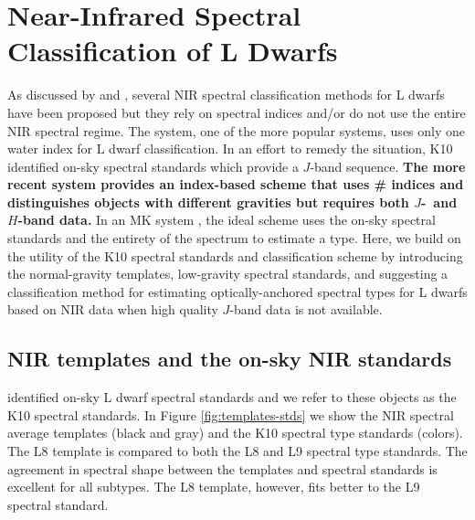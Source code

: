 \documentclass[12pt,preprint]{aastex}
\begin{document}



\section{Near-Infrared Spectral Classification of L Dwarfs}
\label{sec:classification}

As discussed by \citet[\S~3.2]{Kirkpatrick05} and \citet[abbreviated as K10]{Kirkpatrick10}, several NIR spectral classification methods for L dwarfs have been proposed but they rely on spectral indices and/or do not use the entire NIR spectral regime. The \citet{Geballe02} system, one of the more popular systems, uses only one water index for L dwarf classification. In an effort to remedy the situation, K10 identified on-sky spectral standards which provide a $J$-band sequence. 
\textbf{The more recent \citet{Allers:2013hk} system provides an index-based scheme that uses \# indices and distinguishes objects with different gravities but requires both $J$-~and $H$-band data.}
In an MK system \citep{Morgan:1984wy}, the ideal scheme uses the on-sky spectral standards and the entirety of the spectrum to estimate a type. 
Here, we build on the utility of the K10 spectral standards and classification scheme by introducing the normal-gravity templates, low-gravity spectral standards, and suggesting a classification method for estimating optically-anchored spectral types for L dwarfs based on NIR data when high quality $J$-band data is not available.

\subsection{NIR templates and the on-sky NIR standards}

\citet{Kirkpatrick10} identified on-sky L dwarf spectral standards and we refer to these objects as the K10 spectral standards. In Figure \ref{fig:templates-stds} we show the NIR spectral average templates (black and gray) and the K10 spectral type standards (colors). The L8 template is compared to both the L8 and L9 spectral type standards. The agreement in spectral shape between the templates and spectral standards is excellent for all subtypes. The L8 template, however, fits better to the L9 spectral standard.
\end{document}

